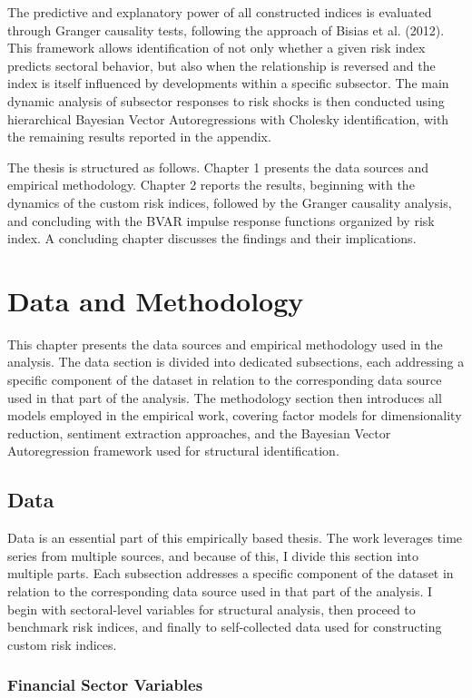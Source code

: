 \documentclass[12pt,a4paper]{report}\usepackage[a4paper, top=2.5cm, bottom=2.5cm, left=2.5cm, right=2.5cm]{geometry}
\begin{document}
The predictive and explanatory power of all constructed indices is evaluated through 
Granger causality tests, following the approach of Bisias et al. (2012). This framework 
allows identification of not only whether a given risk index predicts sectoral behavior, 
but also when the relationship is reversed and the index is itself influenced by 
developments within a specific subsector. The main dynamic analysis of subsector 
responses to risk shocks is then conducted using hierarchical Bayesian Vector 
Autoregressions with Cholesky identification, with the remaining results reported in 
the appendix.

The thesis is structured as follows. Chapter 1 presents the data sources and empirical 
methodology. Chapter 2 reports the results, beginning with the dynamics of the custom 
risk indices, followed by the Granger causality analysis, and concluding with the BVAR 
impulse response functions organized by risk index. A concluding chapter discusses the 
findings and their implications. 

\chapter{Data and Methodology}
This chapter presents the data sources and empirical methodology used in the analysis. The data section is divided into dedicated subsections, each addressing a specific component of the dataset in relation to the corresponding data source used in that part of the analysis. The methodology section then introduces all models employed in the empirical work, covering factor models for dimensionality reduction, sentiment extraction approaches, and the Bayesian Vector Autoregression framework used for structural identification.
\section{Data}

Data is an essential part of this empirically based thesis. The work leverages time series from multiple
sources, and because of this, I divide this section into multiple parts. Each subsection addresses a
specific component of the dataset in relation to the corresponding data source used in that part of
the analysis. I begin with sectoral-level variables for structural analysis, then proceed to benchmark risk indices, and
finally to self-collected data used for constructing custom risk indices.

\subsection{Financial Sector Variables}
\end{document}
